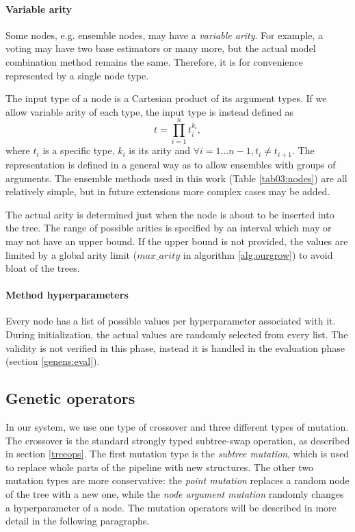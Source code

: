 \paragraph{Variable arity}
Some nodes, e.g. ensemble nodes, may have a \emph{variable arity}.
For example, a voting may have two base estimators or many more, but the
actual model combination method remains the same. Therefore, it is for convenience
represented by a single node type.

The input type of a node is a Cartesian product of its argument types. If we allow
variable arity of each type, the input type is instead defined as
$$t = \prod_{i=1}^{n}t_i^{k_i},$$
where $t_i$ is a specific type, $k_i$ is its arity and $\forall i=1\ldots n - 1, t_i \neq t_{i+1}$.
The representation is defined in a general way as to allow ensembles with groups
of arguments. The ensemble methods used in this work (Table \ref{tab03:nodes})
are all relatively simple, but in future extensions more complex cases may be added.

The actual arity is determined just when the node is about to be inserted
into the tree. The range of possible arities is specified by an interval which may or may not have
an upper bound. If the upper bound is not provided, the values are limited by
a global arity limit ($max\_arity$ in algorithm \ref{alg:ourgrow}) to avoid bloat
of the trees.

\paragraph{Method hyperparameters}
Every node has a list of possible values per hyperparameter associated with
it. During initialization, the actual values are randomly selected from every list.
The validity is not verified in this phase, instead it is handled in the
evaluation phase (section \ref{genens:eval}).

\subsection{Genetic operators} \label{sec:repro}
In our system, we use one type of crossover and three different types of
mutation. The crossover is the standard strongly typed subtree-swap operation,
as described in section \ref{treeops}. The first mutation type is the \emph{subtree
mutation}, which is used to replace whole parts of the pipeline with new structures.
The other two mutation types are more conservative: the \emph{point mutation} replaces
a random node of the tree with a new one, while the \emph{node argument mutation} randomly
changes a hyperparameter of a node.
The mutation operators will be described in more detail in the following paragraphs.

